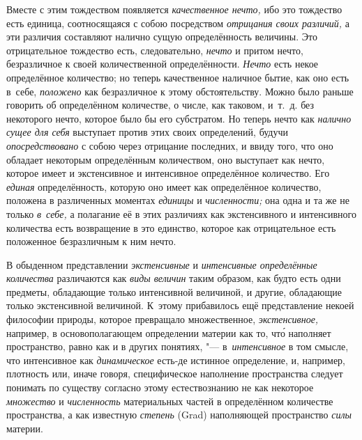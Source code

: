 Вместе с этим тождеством появляется {\em качественное нечто,} ибо это тождество
есть единица, соотносящаяся с собою посредством {\em отрицания своих различий,}
а эти различия составляют налично сущую определённость величины. Это
отрицательное тождество есть, следовательно, {\em нечто} и притом нечто,
безразличное к своей количественной определённости. {\em Нечто} есть некое
определённое количество; но теперь качественное наличное бытие, как оно есть
в~себе, {\em положено} как безразличное к этому обстоятельству. Можно было
раньше говорить об определённом количестве, о числе, как таковом, и~т.~д. без
некоторого нечто, которое было бы его субстратом. Но теперь нечто как
{\em налично сущее для себя} выступает против этих своих определений, будучи
{\em опосредствовано} с собою через отрицание последних, и ввиду того, что оно
обладает некоторым определённым количеством, оно выступает как нечто, которое
имеет и экстенсивное и интенсивное определённое количество. Его {\em единая}
определённость, которую оно имеет как определённое количество, положена в
различенных моментах {\em единицы} и {\em численности;} она одна и та же не
только {\em в~себе,} а полагание её в этих различиях как экстенсивного и
интенсивного количества есть возвращение в это единство, которое как
отрицательное есть положенное безразличным к ним нечто.


В обыденном представлении {\em экстенсивные} и {\em интенсивные определённые
количества} различаются как {\em виды величин} таким образом, как будто есть
одни предметы, обладающие только интенсивной величиной, и другие, обладающие
только экстенсивной величиной. К~этому прибавилось ещё представление
некоей философии природы, которое превращало множественное,
{\em экстенсивное,} например, в основополагающем определении материи как то, чт\'{о} наполняет
пространство, равно как и в других понятиях, "--- в~{\em интенсивное} в
том смысле, что интенсивное как {\em динамическое} есть-де истинное определение,
и, например, плотность или, иначе говоря, специфическое наполнение пространства
следует понимать по существу согласно этому естествознанию не как некоторое
{\em множество} и {\em численность} материальных частей в определённом
количестве пространства, а как известную {\em степень} (Grad) наполняющей
пространство {\em силы} материи.

